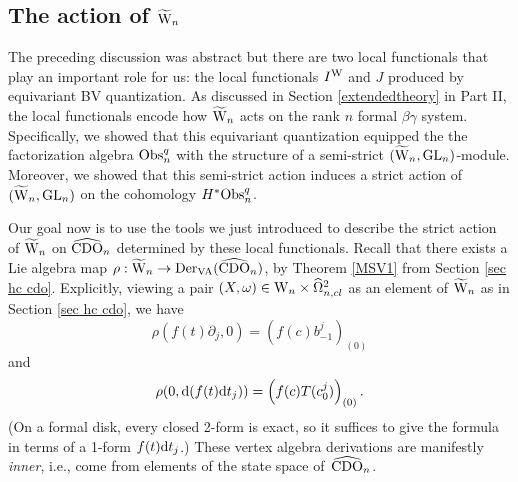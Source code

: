 %
%


\subsection{The action of $\widetilde{{{\rm W}}}_n$}

The preceding discussion was abstract but there are two local functionals that play an important role for us:
the local functionals $I^{{\rm W}}$ and $J$ produced by equivariant BV quantization.
As discussed in Section \ref{extendedtheory} in Part II, the local functionals encode how $\widetilde{{{\rm W}}}_n$ acts on 
the rank $n$ formal $\beta\gamma$ system.
Specifically, we showed that this equivariant quantization equipped the the factorization algebra
${\rm Obs}^q_n$ with the structure of a semi-strict $(\widetilde{{{\rm W}}}_n,{\rm GL}_n)$-module. 
Moreover, we showed that this semi-strict action induces a strict action of $(\widetilde{{{\rm W}}}_n,{\rm GL}_n)$ on the cohomology $H^*{\rm Obs}^q_n$.

Our goal now is to use the tools we just introduced to describe the strict action of $\widetilde{{{\rm W}}}_n$ on $\widehat{\rm CDO}_n$
determined by these local functionals. 
Recall that there exists a Lie algebra map $\rho : \widetilde{{{\rm W}}}_n \to {\rm Der}_{{\rm VA}}(\widehat{\rm CDO}_n)$,
by Theorem \ref{MSV1} from Section \ref{sec hc cdo}.
Explicitly, viewing a pair $(X, \omega) \in {{\rm W}_n} \times \widehat{\Omega}^2_{n,cl}$ as an element of $\widetilde{{{\rm W}}}_n$
as in Section \ref{sec hc cdo}, 
we have
\[
\rho(f(t) \partial_j,0) = (f(c) b_{-1}^j)_{(0)}
\]
and
\[
\rho(0, {\rm d}(f(t) {\rm d} t_j)) = \left(f(c) T (c_0^{j})\right)_{(0)}.
\]
(On a formal disk, every closed 2-form is exact, so it suffices to give the formula in terms of a 1-form $f(t) {\rm d} t_j$.)
These vertex algebra derivations are manifestly \emph{inner}, i.e., come from elements of the state space of~$\widehat{\rm CDO}_n$.

